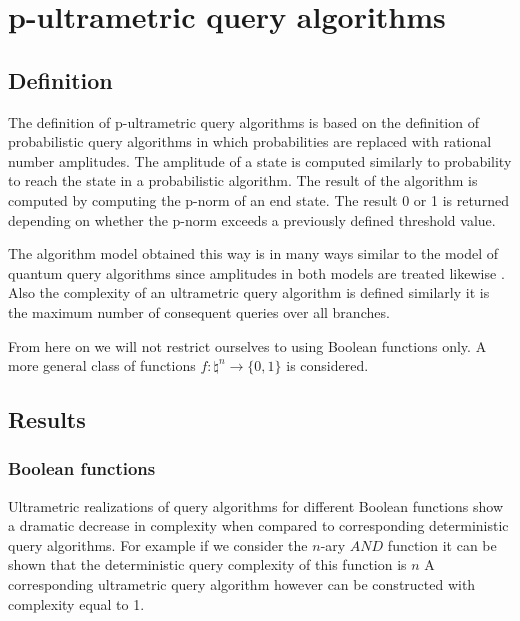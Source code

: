 \documentclass{llncs}
\begin{document}
\section{p-ultrametric query algorithms}
\subsection{Definition}
The definition of p-ultrametric query algorithms is based on the definition of probabilistic query algorithms in which probabilities are replaced with rational number amplitudes. The amplitude of a state is computed similarly to probability to reach the state in a probabilistic algorithm. The result of the algorithm is computed by computing the p-norm of an end state. The result 0 or 1 is returned depending on whether the p-norm exceeds a previously defined threshold value.

The algorithm model obtained this way is in many ways similar to the model of quantum query algorithms since amplitudes in both models are treated likewise \cite{Amb02} \cite{Vas10}. Also the complexity of an ultrametric query algorithm is defined similarly it is the maximum number of consequent queries over all branches.

From here on we will not restrict ourselves to using Boolean functions only. A more general class of functions $f:\natural^n \rightarrow \{0,1\}$ is considered.

\subsection{Results}
\subsubsection{Boolean functions}
Ultrametric realizations of query algorithms for different Boolean functions show a dramatic decrease in complexity when compared to corresponding deterministic query algorithms. For example if we consider the $n$-ary $AND$ function it can be shown that the deterministic query complexity of this function is $n$ A corresponding ultrametric query algorithm however can be constructed with complexity equal to 1.
\end{document}
